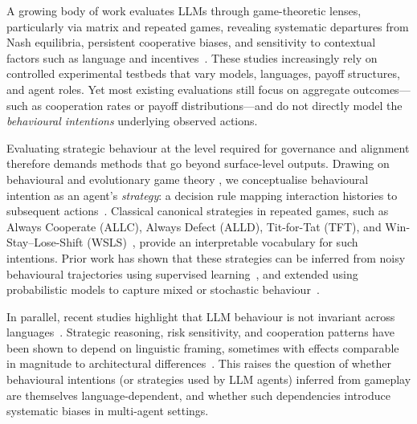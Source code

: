 \documentclass[a4paper,fleqn]{cas-sc}
\begin{document}
A growing body of work evaluates LLMs through game-theoretic lenses, particularly via matrix and repeated games, revealing systematic departures from Nash equilibria, persistent cooperative biases, and sensitivity to contextual factors such as language and incentives~\cite{buscemi2025fairgame,akata2025,sun2025gtllm_survey,mao2025alympics,pal2026strategiescooperationdefectionlarge,willis2025will,fan2024can,pires2025large,fu2026optimal}. 
These studies increasingly rely on controlled experimental testbeds that vary models, languages, payoff structures, and agent roles. Yet most existing evaluations still focus on aggregate outcomes—such as cooperation rates or payoff distributions—and do not directly model the \emph{behavioural intentions} underlying observed actions.

Evaluating strategic behaviour at the level required for governance and alignment therefore demands methods that go beyond surface-level outputs. Drawing on behavioural and evolutionary game theory \cite{sigmund:2010bo}, we conceptualise behavioural intention as an agent's \emph{strategy}: a decision rule mapping interaction histories to subsequent actions~\cite{han2011role,diStefanoIntention2023,Han2012ALIFEjournal,fujimoto2019functional}. Classical canonical strategies in repeated games, such as Always Cooperate (ALLC), Always Defect (ALLD), Tit-for-Tat (TFT), and Win-Stay--Lose-Shift (WSLS)~\cite{Axelrod1980Effective,sigmund:2010bo}, provide an interpretable vocabulary for such intentions. Prior work has shown that these strategies can be inferred from noisy behavioural trajectories using supervised learning~\cite{han2011role,diStefanoIntention2023}, and extended using probabilistic models to capture mixed or stochastic behaviour~\cite{inferenceStrategies}.

In parallel, recent studies highlight that LLM behaviour is not invariant across languages~\cite{buscemi2025fairgame}. Strategic reasoning, risk sensitivity, and cooperation patterns have been shown to depend on linguistic framing, sometimes with effects comparable in magnitude to architectural differences~\cite{loreheydari2024strategic,buscemi2025llms}. This raises the question of whether behavioural intentions (or strategies used by LLM agents) inferred from gameplay are themselves language-dependent, and whether such dependencies introduce systematic biases in multi-agent settings.
\end{document}
